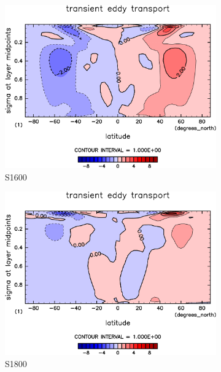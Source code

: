 \documentclass[body]{subfiles}
\begin{document}
\begin{figure}[t]
	\begin{subfigure}{.4\textwidth}
		\centering
		\includegraphics[width=\textwidth]{S1600/MeriHeatTransTest@dryStatEn_TE,time=3650:4015-crop-rotate.pdf}
		\caption{S1600}\label{乾燥静的エネルギー移動性擾乱S1600}
	\end{subfigure}
	\begin{subfigure}{.4\textwidth}
		\centering
		\includegraphics[width=\textwidth]{S1800/MeriHeatTransTest@dryStatEn_TE,time=3650:4015-crop-rotate.pdf}
		\caption{S1800}\label{乾燥静的エネルギー移動性擾乱S1800}
	\end{subfigure}
	\begin{subfigure}{.4\textwidth}

\end{subfigure}
\end{figure}
\end{document}
